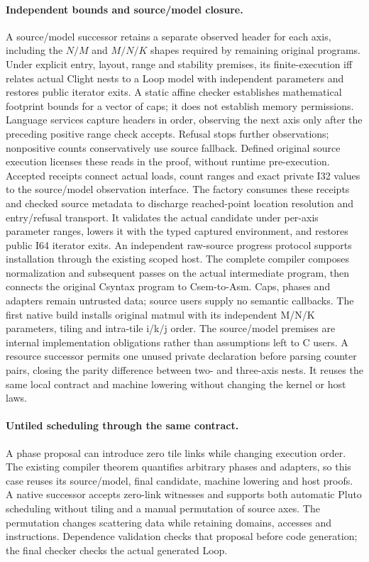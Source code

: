 \paragraph{Independent bounds and source/model closure.}
A source/model successor retains a separate observed header for each axis,
including the $N/M$ and $M/N/K$ shapes required by remaining original programs.
Under explicit entry, layout, range and stability premises, its finite-execution
iff relates actual Clight nests to a Loop model with independent parameters and
restores public iterator exits. A static affine checker establishes mathematical
footprint bounds for a vector of caps; it does not establish memory permissions.
Language services capture headers in order, observing the next axis only after
the preceding positive range check accepts. Refusal stops further observations;
nonpositive counts conservatively use source fallback. Defined original source
execution licenses these reads in the proof, without runtime pre-execution.
Accepted receipts connect actual loads, count ranges and exact private I32
values to the source/model observation interface. The factory consumes these
receipts and checked source metadata to discharge reached-point location
resolution and entry/refusal transport. It validates the actual candidate under
per-axis parameter ranges, lowers it with the typed captured environment, and
restores public I64 iterator exits. An independent raw-source progress protocol
supports installation through the existing scoped host. The complete compiler
composes normalization and subsequent passes on the actual intermediate program,
then connects the original Csyntax program to Csem-to-Asm. Caps, phases and
adapters remain untrusted data; source users supply no semantic callbacks.
The first native build installs original matmul with its independent M/N/K
parameters, tiling and intra-tile i/k/j order. The source/model premises are
internal implementation obligations rather than assumptions left to C users.
A resource successor permits one unused private declaration before parsing
counter pairs, closing the parity difference between two- and three-axis nests.
It reuses the same local contract and machine lowering without changing the
kernel or host laws.
\paragraph{Untiled scheduling through the same contract.}
A phase proposal can introduce zero tile links while changing execution order.
The existing compiler theorem quantifies arbitrary phases and adapters, so this
case reuses its source/model, final candidate, machine lowering and host proofs.
A native successor accepts zero-link witnesses and supports both automatic
Pluto scheduling without tiling and a manual permutation of source axes.
The permutation changes scattering data while retaining domains, accesses and
instructions. Dependence validation checks that proposal before code generation;
the final checker checks the actual generated Loop.

